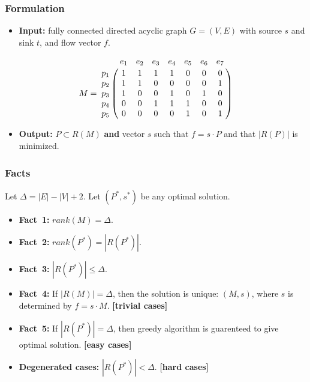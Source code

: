 \frame
{
	\frametitle{Formulation}

	\begin{itemize}
	\item<1-> {\bf Input:} fully connected directed acyclic graph $G=(V,E)$ with source $s$ and sink $t$,
		and flow vector $f$.
	\end{itemize}

	\vspace{0.8cm}
	
	\vspace{-0.1cm}

	\begin{displaymath}
	M = \bordermatrix{
		~   & e_1 & e_2 & e_3 & e_4 & e_5 & e_6 & e_7 \cr
		p_1 & 1 & 1 & 1 & 1 & 0 & 0 & 0 \cr
		p_2 & 1 & 1 & 0 & 0 & 0 & 0 & 1 \cr
		p_3 & 1 & 0 & 0 & 1 & 0 & 1 & 0 \cr
		p_4 & 0 & 0 & 1 & 1 & 1 & 0 & 0 \cr
		p_5 & 0 & 0 & 0 & 0 & 1 & 0 & 1 \cr
	}
	\end{displaymath}

	\vspace{0.1cm}

	\begin{itemize}
	\item<1-> {\bf Output:} $P\subset R(M)$ {\bf and} vector $s$
		such that $f = s\cdot P$ and that $|R(P)|$ is minimized.
	\end{itemize}
}

\frame
{
	\frametitle{Facts}
	Let $\Delta = |E| - |V| + 2$. Let $(P^*, s^*)$ be any optimal solution.
	\vspace{0.3cm}
	\begin{itemize}
	\item<1-> {\bf Fact~1:} $rank(M) = \Delta$.
	\vspace{0.3cm}
	\item<1-> {\bf Fact~2:} $rank(P^*) = |R(P^*)|$.
	\vspace{0.3cm}
	\item<1-> {\bf Fact~3:} $|R(P^*)| \le \Delta$.
	\vspace{0.3cm}
	\item<1-> {\bf Fact~4:} If $|R(M)| = \Delta$, then the solution is unique: $(M, s)$, where
		$s$ is determined by $f = s\cdot M$. {\bf [trivial cases]}
	\vspace{0.3cm}
	\item<1-> {\bf Fact~5:} If $|R(P^*)| = \Delta$, then greedy algorithm is guarenteed to give optimal
		solution. {\bf [easy cases]}
	\vspace{0.3cm}
	\item<1-> {\bf Degenerated cases:} $|R(P^*)| < \Delta$. {\bf [hard cases]}
	\end{itemize}
}

